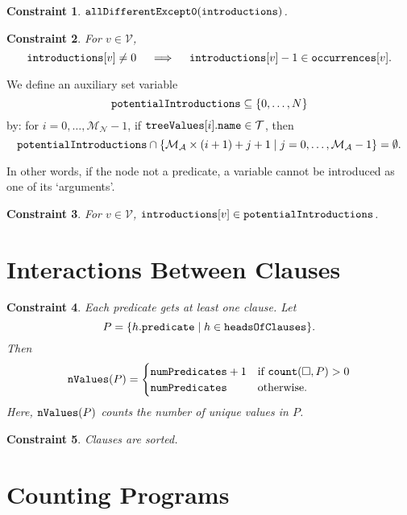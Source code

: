 \documentclass[runningheads]{llncs}
\newtheorem{constraint}{Constraint}
\newcommand{\variable}[1]{\texttt{\textup{#1}}}
\newcommand{\variables}{\mathcal{V}}
\newcommand{\tokens}{\mathcal{T}}
\newcommand{\maxArity}{\mathcal{M}_{\mathcal{A}}}
\newcommand{\maxNumNodes}{\mathcal{M}_{\mathcal{N}}}
\begin{document}
\begin{constraint}
  $\variable{allDifferentExcept0}(\variable{introductions})$.
\end{constraint}

\begin{constraint}
  For $v \in \variables{}$,
  \[
    \variable{introductions}[v] \ne 0 \quad \implies \quad
    \variable{introductions}[v] - 1 \in \variable{occurrences}[v].
  \]
\end{constraint}

\begin{definition}
  We define an auxiliary set variable
  \[
    \variable{potentialIntroductions} \subseteq \{ 0, \dots, N \}
  \]
  by: for $i = 0, \dots, \maxNumNodes{} - 1$, if
  $\variable{treeValues}[i].\variable{name} \in \tokens{}$, then
  \[
    \variable{potentialIntroductions} \cap \{ \maxArity{} \times (i + 1) + j + 1
    \mid j = 0, \dots, \maxArity{} - 1 \} = \emptyset.
  \]
\end{definition} %
In other words, if the node not a predicate, a variable cannot be introduced as
one of its `arguments'.

\begin{constraint}
  For $v \in \variables{}$, $\variable{introductions}[v] \in
  \variable{potentialIntroductions}$.
\end{constraint}

\section{Interactions Between Clauses}

\begin{constraint}
  Each predicate gets at least one clause. Let
  \[
    P = \{ h.\variable{predicate} \mid h \in \variable{headsOfClauses} \}.
  \]
  Then
  \[
    \variable{nValues}(P) =
    \begin{cases}
      \variable{numPredicates} + 1 & \text{if } \variable{count}(\Box, P) > 0 \\
      \variable{numPredicates} & \text{otherwise.}
    \end{cases}
  \]
  Here, $\variable{nValues}(P)$ counts the number of unique values in $P$.
\end{constraint}

\begin{constraint}
  Clauses are sorted.
\end{constraint}

\section{Counting Programs}
\end{document}
